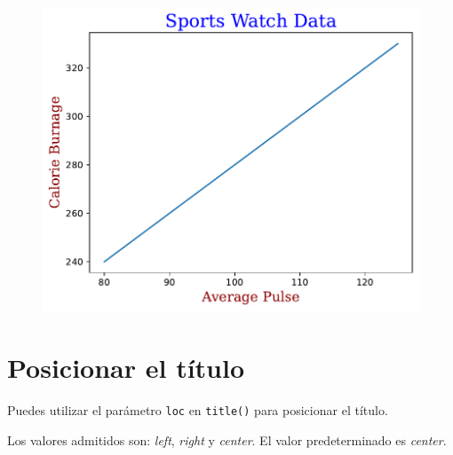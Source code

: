 \begin{code}
\begin{Shaded}
\begin{Highlighting}[]
\end{Highlighting}
\end{Shaded}

\begin{figure}
  \centering
  \includegraphics[scale=0.6]{img/grafica1025.pdf}
\end{figure}
\end{code}

\section{Posicionar el título}

Puedes utilizar el parámetro \texttt{loc} en \texttt{title()} para
posicionar el título.

Los valores admitidos son:
\emph{\textquotesingle left\textquotesingle{}},
\emph{\textquotesingle right\textquotesingle{}} y
\emph{\textquotesingle center\textquotesingle{}}. El valor
predeterminado es \emph{\textquotesingle center\textquotesingle{}}.

